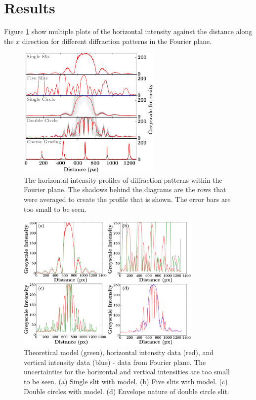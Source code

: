 \documentclass[twocolumn]{revtex4}
\begin{document}
\section{Results}
\vspace{-2ex}
Figure \ref{horizontal_profiles} show multiple plots of the horizontal intensity against the distance along the $x$ direction for different diffraction patterns in the Fourier plane.
\begin{figure}[!h]
\begin{center}
\includegraphics[width=7cm]{results/horizontal_intensity_profiles2}
\caption[]{The horizontal intensity profiles of diffraction patterns within the Fourier plane. The shadows behind the diagrams are the rows that were averaged to create the profile that is shown. The error bars are too small to be seen.}
\label{horizontal_profiles}
\end{center}
\end{figure}
\begin{figure}[!h]
\begin{center}
\includegraphics[width=9cm]{results/data_and_models2}
\caption[]{Theoretical model (green), horizontal intensity data (red), and vertical intensity data (blue) - data from Fourier plane. The uncertainties for the horizontal and vertical intensities are too small to be seen. (a) Single slit with model. (b) Five slits with model. (c) Double circles with model. (d) Envelope nature of double circle slit.}
\label{datamodels}
\end{center}
\end{figure}
\end{document}
